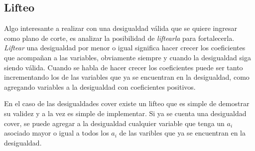 \bigskip
\subsection{Lifteo}

Algo interesante a realizar con una desigualdad v\'alida que se quiere ingresar como plano de corte, es analizar la posibilidad de \emph{liftearla} para fortalecerla. \emph{Liftear} una desigualdad por menor o igual significa hacer crecer los coeficientes que acompa\~nan a las variables, obviamente siempre y cuando la desigualdad siga siendo v\'alida. Cuando se habla de hacer crecer los coeficientes puede ser tanto incrementando los de las variables que ya se encuentran en la desigualdad, como agregando variables a la desigualdad con coeficientes positivos.


En el caso de las desigualdades cover existe un lifteo que es simple de demostrar su validez y a la vez es simple de implementar. Si ya se cuenta una desigualdad cover, se puede agregar a la desigualdad cualquier variable que tenga un $a_i$ asociado mayor o igual a todos los $a_i$ de las varibles que ya se encuentran en la desigualdad.


